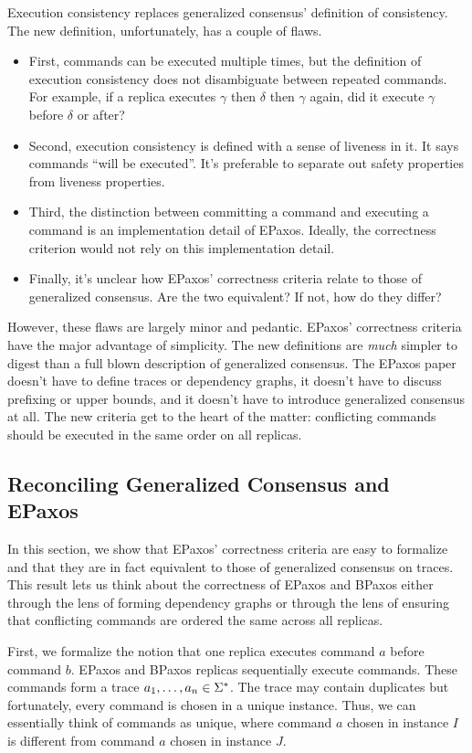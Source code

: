 Execution consistency replaces generalized consensus' definition of
consistency. The new definition, unfortunately, has a couple of flaws.
\begin{itemize}
  \item
    First, commands can be executed multiple times, but the definition of
    execution consistency does not disambiguate between repeated commands.
    For example, if a replica executes $\gamma$ then $\delta$ then $\gamma$
    again, did it execute $\gamma$ before $\delta$ or after?
  \item
    Second, execution consistency is defined with a sense of liveness in it.
    It says commands ``will be executed''. It's preferable to separate out
    safety properties from liveness properties.
  \item
    Third, the distinction between committing a command and executing a command
    is an implementation detail of EPaxos. Ideally, the correctness criterion
    would not rely on this implementation detail.
  \item
    Finally, it's unclear how EPaxos' correctness criteria relate to those of
    generalized consensus. Are the two equivalent? If not, how do they differ?
\end{itemize}

However, these flaws are largely minor and pedantic.  EPaxos' correctness
criteria have the major advantage of simplicity.  The new definitions are
\emph{much} simpler to digest than a full blown description of generalized
consensus. The EPaxos paper doesn't have to define traces or dependency graphs,
it doesn't have to discuss prefixing or upper bounds, and it doesn't have to
introduce generalized consensus at all. The new criteria get to the heart of
the matter: conflicting commands should be executed in the same order on all
replicas.

\subsection{Reconciling Generalized Consensus and EPaxos}
In this section, we show that EPaxos' correctness criteria are easy to
formalize and that they are in fact equivalent to those of generalized
consensus on traces. This result lets us think about the correctness of EPaxos
and BPaxos either through the lens of forming dependency graphs or through the
lens of ensuring that conflicting commands are ordered the same across all
replicas.

First, we formalize the notion that one replica executes command $a$ before
command $b$. EPaxos and BPaxos replicas sequentially execute commands. These
commands form a trace $a_1, \ldots, a_n \in \Sigma^*$. The trace may contain
duplicates but fortunately, every command is chosen in a unique instance. Thus,
we can essentially think of commands as unique, where command $a$ chosen in
instance $I$ is different from command $a$ chosen in instance $J$.

